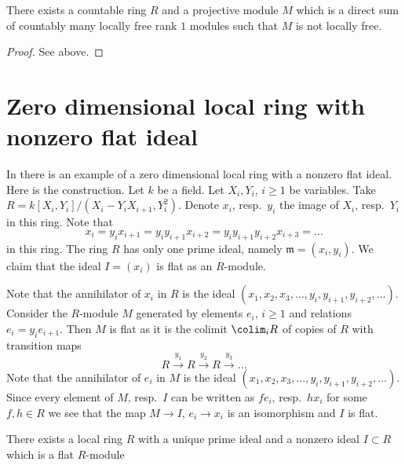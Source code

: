 \begin{lemma}
\label{lemma-projective-not-locally-free}
There exists a countable ring $R$ and a projective module $M$
which is a direct sum of countably many locally free rank $1$
modules such that $M$ is not locally free.
\end{lemma}

\begin{proof}
See above.
\end{proof}







\section{Zero dimensional local ring with nonzero flat ideal}
\label{section-zero-dimensional-flat-ideal}

\noindent
In \cite{Lazard} there is an example of a zero dimensional local ring with a
nonzero flat ideal. Here is the construction. Let $k$ be a field.
Let $X_i, Y_i$, $i \geq 1$ be variables. Take
$R = k[X_i, Y_i]/(X_i - Y_i X_{i + 1}, Y_i^2)$. Denote $x_i$, resp.\ $y_i$
the image of $X_i$, resp.\ $Y_i$ in this ring. Note that
$$
x_i = y_i x_{i + 1} = y_i y_{i +1} x_{i + 2} =
y_i y_{i + 1} y_{i + 2} x_{i + 3} = \ldots
$$
in this ring. The ring $R$ has only
one prime ideal, namely $\mathfrak m = (x_i, y_i)$. We claim that
the ideal $I = (x_i)$ is flat as an $R$-module.

\medskip\noindent
Note that the annihilator of $x_i$ in $R$ is the ideal
$(x_1, x_2, x_3, \ldots, y_i, y_{i + 1}, y_{i + 2}, \ldots)$.
Consider the $R$-module $M$ generated by elements $e_i$, $i \geq 1$ and
relations $e_i = y_i e_{i + 1}$. Then $M$ is flat as it is the
colimit $\colim_i R$ of copies of $R$ with transition maps
$$
R \xrightarrow{y_1} R \xrightarrow{y_2} R \xrightarrow{y_3} \ldots
$$
Note that the annihilator of $e_i$ in $M$ is the ideal
$(x_1, x_2, x_3, \ldots, y_i, y_{i + 1}, y_{i + 2}, \ldots)$.
Since every element of $M$, resp.\ $I$ can be written as
$f e_i$, resp.\ $h x_i$ for some $f, h \in R$ we see that the
map $M \to I$, $e_i \to x_i$ is an isomorphism and $I$ is flat.

\begin{lemma}
\label{lemma-zero-dimensional-flat-ideal}
There exists a local ring $R$ with a unique prime ideal
and a nonzero ideal $I \subset R$ which is a flat $R$-module
\end{lemma}


